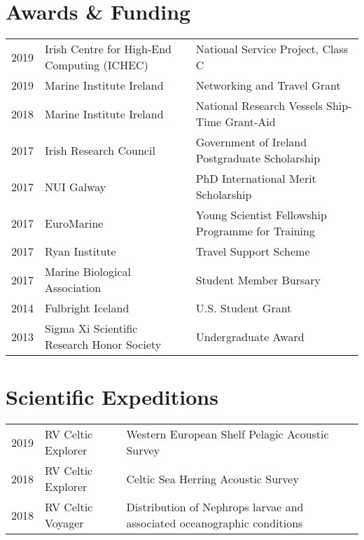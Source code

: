 \documentclass[a4paper]{deedy-resume} %
\begin{document}
\begin{flushleft}
\sectionspace




\section{Awards \& Funding}

\begin{tabular}{ l l l }
2019 & Irish Centre for High-End Computing (ICHEC) & National Service Project, Class C \\
2019 & Marine Institute Ireland & Networking and Travel Grant \\
2018 & Marine Institute Ireland & National Research Vessels Ship-Time Grant-Aid \\
2017 & Irish Research Council & Government of Ireland Postgraduate Scholarship \\
2017 & NUI Galway & PhD International Merit Scholarship \\
2017 & EuroMarine & Young Scientist Fellowship Programme for Training \\
2017 & Ryan Institute & Travel Support Scheme \\
2017 & Marine Biological Association & Student Member Bursary \\
2014 & Fulbright Iceland & U.S. Student Grant \\
2013 & Sigma Xi Scientific Research Honor Society & Undergraduate Award

\end{tabular}

\sectionspace %



\sectionspace %

\section{Scientific Expeditions}

\begin{tabular}{l l l}
2019 & RV Celtic Explorer & Western European Shelf Pelagic Acoustic Survey \\
2018 & RV Celtic Explorer & Celtic Sea Herring Acoustic Survey \\
2018 & RV Celtic Voyager & Distribution of Nephrops larvae and associated oceanographic conditions \\
\end{tabular}

\sectionspace %

\end{flushleft}
\end{document}
